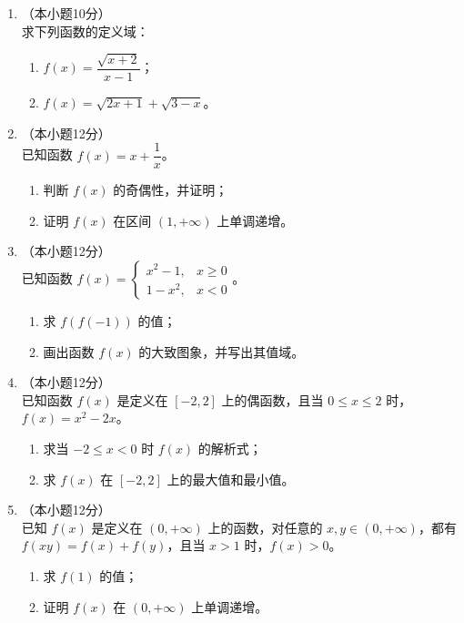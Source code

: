 \documentclass[12pt, a4paper]{ctexart}
\begin{document}
\begin{enumerate}[resume]
\item[17.]（本小题10分）\\
求下列函数的定义域：
\begin{enumerate}[(1)]
  \item $f(x)=\dfrac{\sqrt{x+2}}{x-1}$；
  \item $f(x)=\sqrt{2x+1}+\sqrt{3-x}$。
\end{enumerate}

\vspace{6cm}

\item[18.]（本小题12分）\\
已知函数 $f(x)=x+\dfrac{1}{x}$。
\begin{enumerate}[(1)]
  \item 判断 $f(x)$ 的奇偶性，并证明；
  \item 证明 $f(x)$ 在区间 $(1,+\infty)$ 上单调递增。
\end{enumerate}

\vspace{6cm}

\item[19.]（本小题12分）\\
已知函数 $f(x)=\begin{cases} x^2-1, & x\geq 0 \\ 1-x^2, & x<0 \end{cases}$。
\begin{enumerate}[(1)]
  \item 求 $f(f(-1))$ 的值；
  \item 画出函数 $f(x)$ 的大致图象，并写出其值域。
\end{enumerate}

\vspace{6cm}

\item[20.]（本小题12分）\\
已知函数 $f(x)$ 是定义在 $[-2,2]$ 上的偶函数，且当 $0\leq x\leq 2$ 时，$f(x)=x^2-2x$。
\begin{enumerate}[(1)]
  \item 求当 $-2\leq x<0$ 时 $f(x)$ 的解析式；
  \item 求 $f(x)$ 在 $[-2,2]$ 上的最大值和最小值。
\end{enumerate}

\vspace{6cm}

\item[21.]（本小题12分）\\
已知 $f(x)$ 是定义在 $(0,+\infty)$ 上的函数，对任意的 $x,y\in(0,+\infty)$，都有 $f(xy)=f(x)+f(y)$，且当 $x>1$ 时，$f(x)>0$。
\begin{enumerate}[(1)]
  \item 求 $f(1)$ 的值；
  \item 证明 $f(x)$ 在 $(0,+\infty)$ 上单调递增。
\end{enumerate}


\end{enumerate}
\end{document}
